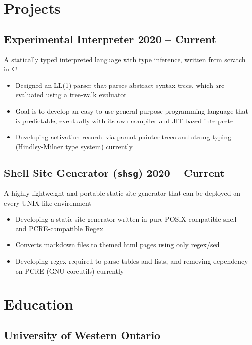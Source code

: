 \documentclass{article}
\begin{document}
\section*{Projects}

\subsection{Experimental Interpreter \hfill \normalsize\textnormal{2020 -- Current}}
A statically typed interpreted language with type inference, written from scratch in C
\vspace{-0.5em}
\begin{itemize}
    \item Designed an LL(1) parser that parses abstract syntax trees, which are evaluated using a tree-walk evaluator 
    \item Goal is to develop an easy-to-use general purpose programming language that is predictable, eventually with its own compiler and JIT based interpreter 
    \item Developing activation records via parent pointer trees and strong typing (Hindley-Milner type system) currently
\end{itemize}

\subsection{Shell Site Generator (\texttt{shsg}) \hfill \normalsize\textnormal{2020 -- Current}}
    A highly lightweight and portable static site generator that can be deployed on every UNIX-like environment
\vspace{-0.5em}
\begin{itemize}
    \item Developing a static site generator written in pure POSIX-compatible shell and PCRE-compatible Regex
    \item Converts markdown files to themed html pages using only regex/sed 
    \item Developing regex required to parse tables and lists, and removing dependency on PCRE (GNU coreutils) currently
\end{itemize}

\section{Education}
\subsection{University of Western Ontario}
\end{document}
